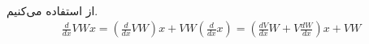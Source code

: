 \\
از
استفاده می‌کنیم.
\begin{gather*}
    \frac{d}{dx} VWx = (\frac{d}{dx}VW) x + VW (\frac{d}{dx} x) = (\frac{dV}{dx}W + V\frac{dW}{dx})x + VW
\end{gather*}